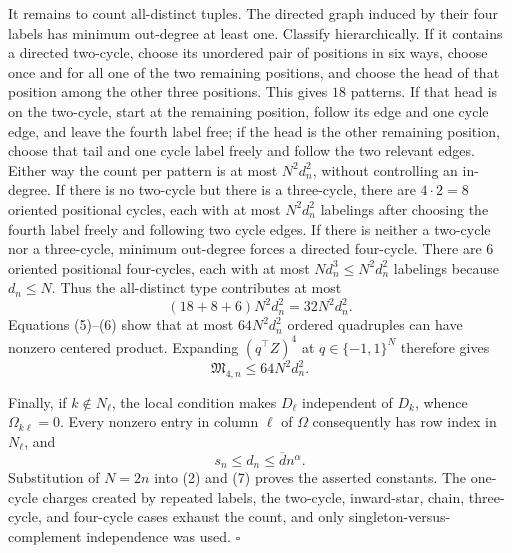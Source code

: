 It remains to count all-distinct tuples.  The directed graph induced by their four labels has minimum out-degree at least one.  Classify hierarchically.  If it contains a directed two-cycle, choose its unordered pair of positions in six ways, choose once and for all one of the two remaining positions, and choose the head of that position among the other three positions.  This gives \(18\) patterns.  If that head is on the two-cycle, start at the remaining position, follow its edge and one cycle edge, and leave the fourth label free; if the head is the other remaining position, choose that tail and one cycle label freely and follow the two relevant edges.  Either way the count per pattern is at most \(N^2d_n^2\), without controlling an in-degree.  If there is no two-cycle but there is a three-cycle, there are \(4\cdot2=8\) oriented positional cycles, each with at most \(N^2d_n^2\) labelings after choosing the fourth label freely and following two cycle edges.  If there is neither a two-cycle nor a three-cycle, minimum out-degree forces a directed four-cycle.  There are \(6\) oriented positional four-cycles, each with at most \(Nd_n^3\le N^2d_n^2\) labelings because \(d_n\le N\).  Thus the all-distinct type contributes at most
\[
(18+8+6)N^2d_n^2=32N^2d_n^2.
\tag{6}
\]
Equations (5)--(6) show that at most \(64N^2d_n^2\) ordered quadruples can have nonzero centered product.  Expanding \((q^\top Z)^4\) at \(q\in\{-1,1\}^N\) therefore gives
\[
\mathfrak M_{4,n}\le64N^2d_n^2.
\tag{7}
\]

Finally, if \(k\notin N_\ell\), the local condition makes \(D_\ell\) independent of \(D_k\), whence \(\Omega_{k\ell}=0\).  Every nonzero entry in column \(\ell\) of \(\Omega\) consequently has row index in \(N_\ell\), and
\[
s_n\le d_n\le\overline d n^\alpha.
\tag{8}
\]
Substitution of \(N=2n\) into (2) and (7) proves the asserted constants.  The one-cycle charges created by repeated labels, the two-cycle, inward-star, chain, three-cycle, and four-cycle cases exhaust the count, and only singleton-versus-complement independence was used. \(\square\)